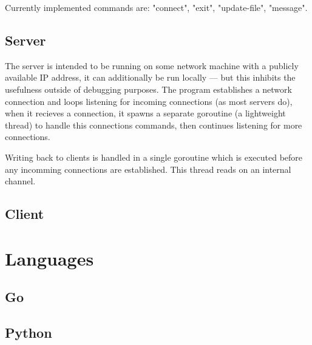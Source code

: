 \documentclass[10pt, letterpaper]{article}
\begin{document}
Currently implemented commands are: "connect", "exit", "update-file", 
"message".

\subsection*{Server}

The server is intended to be running on some network machine with a publicly 
available IP address, it can additionally be run locally --- but this inhibits 
the usefulness outside of debugging purposes. The program establishes a 
network connection and loops listening for incoming connections (as most 
servers do), when it recieves a connection, it spawns a separate goroutine 
(a lightweight thread) to handle this connections commands, then continues 
listening for more connections.

Writing back to clients is handled in a single goroutine which is executed 
before any incomming connections are established. This thread reads on an 
internal channel.

\subsection*{Client}

\section*{Languages}

\subsection*{Go}

\subsection*{Python}
\end{document}
